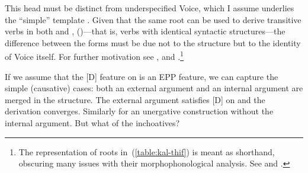 This head must be distinct from underspecified Voice, which I assume underlies the ``simple'' template {\tkal}. Given that the same root can be used to derive transitive verbs in both {\tkal} and {\thif}, (\nextx)---that is, verbs with identical syntactic structures---the difference between the forms must be due not to the structure but to the identity of Voice itself. For further motivation see \cite{kastner16phd,kastner17gjgl,kastner18nllt}, \cite{nie17} and \cite{osekikastner17}.\footnote{The representation of roots in~(\ref{table:kal-thif}) is meant as shorthand, obscuring many issues with their morphophonological analysis. See \cite{faust12,faust16} and \cite{kastner18nllt}.}
\ex\label{table:kal-thif}	
\xe
		
If we assume that the [D] feature on {\vd} is an EPP feature, we can capture the simple (causative) cases: both an external argument and an internal argument are merged in the structure. The external argument satisfies [D] on {\vd} and the derivation converges. Similarly for an unergative construction without the internal argument. But what of the inchoatives?

